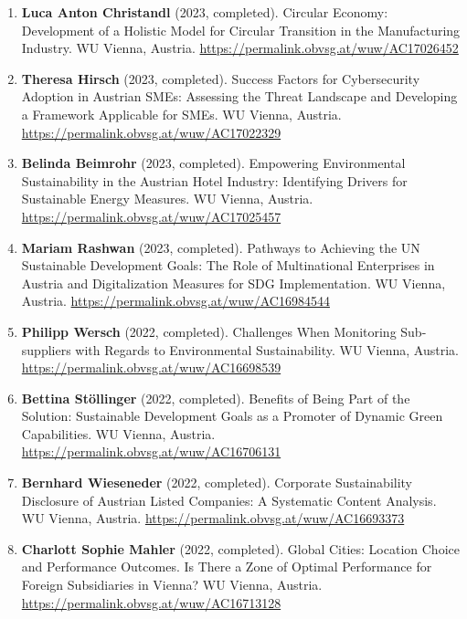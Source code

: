 \documentclass[11pt,a4paper]{article}
\begin{document}
\begin{cv}
\begin{enumerate}
    \item \textbf{Luca Anton Christandl} (2023, completed). Circular Economy: Development of a Holistic Model for Circular Transition in the Manufacturing Industry. WU Vienna, Austria. \url{https://permalink.obvsg.at/wuw/AC17026452}
    
    \item \textbf{Theresa Hirsch} (2023, completed). Success Factors for Cybersecurity Adoption in Austrian SMEs: Assessing the Threat Landscape and Developing a Framework Applicable for SMEs. WU Vienna, Austria. \url{https://permalink.obvsg.at/wuw/AC17022329}
    
    \item \textbf{Belinda Beimrohr} (2023, completed). Empowering Environmental Sustainability in the Austrian Hotel Industry: Identifying Drivers for Sustainable Energy Measures. WU Vienna, Austria. \url{https://permalink.obvsg.at/wuw/AC17025457}
    
    \item \textbf{Mariam Rashwan} (2023, completed). Pathways to Achieving the UN Sustainable Development Goals: The Role of Multinational Enterprises in Austria and Digitalization Measures for SDG Implementation. WU Vienna, Austria. \url{https://permalink.obvsg.at/wuw/AC16984544}
    
    \item \textbf{Philipp Wersch} (2022, completed). Challenges When Monitoring Sub-suppliers with Regards to Environmental Sustainability. WU Vienna, Austria. \url{https://permalink.obvsg.at/wuw/AC16698539}
    
    \item \textbf{Bettina Stöllinger} (2022, completed). Benefits of Being Part of the Solution: Sustainable Development Goals as a Promoter of Dynamic Green Capabilities. WU Vienna, Austria. \url{https://permalink.obvsg.at/wuw/AC16706131}
    
    \item \textbf{Bernhard Wieseneder} (2022, completed). Corporate Sustainability Disclosure of Austrian Listed Companies: A Systematic Content Analysis. WU Vienna, Austria. \url{https://permalink.obvsg.at/wuw/AC16693373}
    
    \item \textbf{Charlott Sophie Mahler} (2022, completed). Global Cities: Location Choice and Performance Outcomes. Is There a Zone of Optimal Performance for Foreign Subsidiaries in Vienna? WU Vienna, Austria. \url{https://permalink.obvsg.at/wuw/AC16713128}
    

\end{enumerate}
\end{cv}
\end{document}
